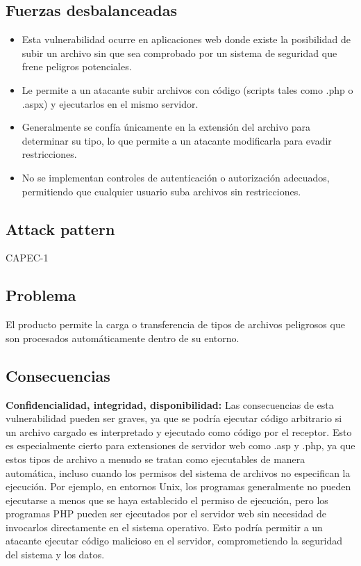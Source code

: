 \subsection{Fuerzas desbalanceadas}
\begin{itemize}
    \item Esta vulnerabilidad ocurre en aplicaciones web donde existe la posibilidad de subir un archivo sin que sea comprobado por un sistema de seguridad que frene peligros potenciales.
    \item Le permite a un atacante subir archivos con código (scripts tales como .php o .aspx) y ejecutarlos en el mismo servidor.
    \item Generalmente se confía únicamente en la extensión del archivo para determinar su tipo, lo que permite a un atacante modificarla para evadir restricciones.
    \item No se implementan controles de autenticación o autorización adecuados, permitiendo que cualquier usuario suba archivos sin restricciones.
\end{itemize}

\subsection{Attack pattern}
CAPEC-1
\subsection{Problema}
El producto permite la carga o transferencia de tipos de archivos peligrosos que son procesados automáticamente dentro de su entorno.
\subsection{Consecuencias}
\textbf{Confidencialidad, integridad, disponibilidad:} Las consecuencias de esta vulnerabilidad pueden ser graves, ya que se podría ejecutar código arbitrario si un archivo cargado es interpretado y ejecutado como código por el receptor. Esto es especialmente cierto para extensiones de servidor web como .asp y .php, ya que estos tipos de archivo a menudo se tratan como ejecutables de manera automática, incluso cuando los permisos del sistema de archivos no especifican la ejecución. Por ejemplo, en entornos Unix, los programas generalmente no pueden ejecutarse a menos que se haya establecido el permiso de ejecución, pero los programas PHP pueden ser ejecutados por el servidor web sin necesidad de invocarlos directamente en el sistema operativo. Esto podría permitir a un atacante ejecutar código malicioso en el servidor, comprometiendo la seguridad del sistema y los datos.
